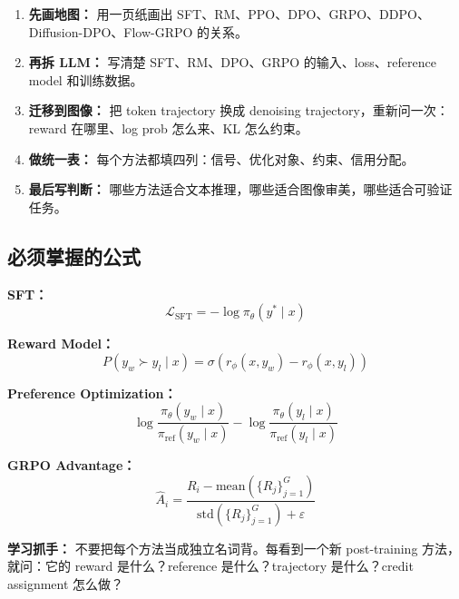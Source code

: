 \begin{enumerate}[leftmargin=1.5em]
  \item \textbf{先画地图：} 用一页纸画出 SFT、RM、PPO、DPO、GRPO、DDPO、Diffusion-DPO、Flow-GRPO 的关系。
  \item \textbf{再拆 LLM：} 写清楚 SFT、RM、DPO、GRPO 的输入、loss、reference model 和训练数据。
  \item \textbf{迁移到图像：} 把 token trajectory 换成 denoising trajectory，重新问一次：reward 在哪里、log prob 怎么来、KL 怎么约束。
  \item \textbf{做统一表：} 每个方法都填四列：信号、优化对象、约束、信用分配。
  \item \textbf{最后写判断：} 哪些方法适合文本推理，哪些适合图像审美，哪些适合可验证任务。
\end{enumerate}

\subsection{必须掌握的公式}

\textbf{SFT：}
\[
\mathcal{L}_\text{SFT} = - \log \pi_\theta(y^\ast \mid x)
\]

\textbf{Reward Model：}
\[
P(y_w \succ y_l \mid x) = \sigma(r_\phi(x, y_w) - r_\phi(x, y_l))
\]

\textbf{Preference Optimization：}
\[
\log \frac{\pi_\theta(y_w \mid x)}{\pi_\text{ref}(y_w \mid x)}
-
\log \frac{\pi_\theta(y_l \mid x)}{\pi_\text{ref}(y_l \mid x)}
\]

\textbf{GRPO Advantage：}
\[
\hat{A}_i = \frac{R_i - \mathrm{mean}(\{R_j\}_{j=1}^G)}{\mathrm{std}(\{R_j\}_{j=1}^G) + \varepsilon}
\]

\begin{intubox}
\textbf{学习抓手：} 不要把每个方法当成独立名词背。每看到一个新 post-training 方法，就问：它的 reward 是什么？reference 是什么？trajectory 是什么？credit assignment 怎么做？
\end{intubox}
